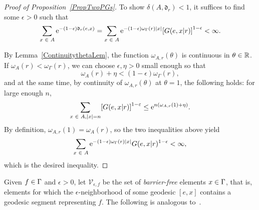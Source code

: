 \documentclass[AHL,Unicode,longabstracts]{cedram}
\newcommand{\R}{\mathbb{R}}
\newcommand{\rme}{\mathrm{e}}
\newcommand{\fkd}{\mathfrak{d}}
\newcommand{\clV}{\mathcal{V}}
\let\originalleft\left
\let\originalright\right
\renewcommand{\left}{\mathopen{}\mathclose\bgroup\originalleft}
\renewcommand{\right}{\aftergroup\egroup\originalright}
\let\oldin\in
\renewcommand{\in}{\mathchoice{\oldin}{\oldin}{\,\oldin\,}{\,\oldin\,}}
\begin{document}
\begin{proof}[Proof of Proposition~\ref{PropTwoPGs}]
To show $\delta(A,\fkd_r)<1$, it suffices to find some $\epsilon > 0$ such that
\[
\sum_{x \in A} \rme^{- (1 - \epsilon) \fkd_r(e, x)} = \sum_{x \in A} \rme^{- (1 - \epsilon) \omega_{\Gamma}(r) |x|} \left[G(e, x | r) \right]^{1 - \epsilon} < \infty.
\]



By Lemma~\ref{ContinuitythetaLem}, the function $\omega_{A,r}(\theta)$ is continuous in $\theta\in\R$. If $\omega_A(r) < \omega_{\Gamma}(r)$, we can choose $\epsilon,\eta>0$ small enough so that
\[
\omega_A(r) + \eta < (1 - \epsilon) \omega_{\Gamma}(r),
\]
and at the same time, by continuity of $\omega_{A,r}(\theta)$ at $\theta=1$, the following holds: for large enough $n$,
\[
\sum_{x \in A, |x| = n} \left[G(e, x | r) \right]^{1 - \varepsilon} \leq \rme^{n \left(\omega_{A,r}(1) + \eta \right)}.
\]
By definition, $\omega_{A,r}(1)=\omega_A(r)$, so the two inequalities above yield
\[
\sum_{x \in A} \rme^{- (1 - \epsilon) \omega_{\Gamma}(r) |x|} G(e, x | r)^{1-\epsilon} < \infty,
\]
which is the desired inequality.
\end{proof}

Given $f\in \Gamma$ and $\epsilon>0$, let $\clV_{\epsilon, f}$ be the set of \emph{barrier-free} elements $x\in \Gamma$, that is, elements for which the $\epsilon$-neighborhood of some geodesic $[e,x]$ contains a geodesic segment representing $f$. The following is analogous to~\cite[Theorem~C]{YangSCC}.
\end{document}
